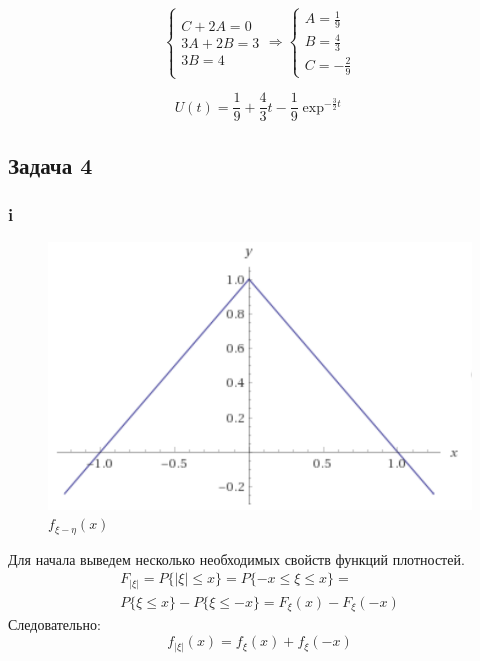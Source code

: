 \documentclass[a4paper,12pt]{article}
\begin{document}
\begin{equation}
\left\{ \begin{array} { l } { C + 2 A = 0 } \\ { 3 A + 2 B = 3 } \\ { 3 B = 4 } \end{array} \Rightarrow \left\{ \begin{array} { l } { A = \frac { 1 } { 9 } } \\ { B = \frac { 4 } { 3 } } \\ { C = - \frac { 2 } { 9 } } \end{array} \right. \right.
\end{equation}


\[ U(t) = \frac{1}{9} + \frac{4}{3}t - \frac{1}{9}\exp^{-\frac{3}{2}t}\]

\subsection{Задача 4}
\subsubsection{i}

 \begin{figure}
	\includegraphics[width=\linewidth]{13}
	\caption{$  f_{\xi - \eta}(x) $}
	\label{minmax}
\end{figure}


Для начала выведем несколько необходимых свойств функций плотностей.
\begin{equation}
\begin{aligned}
	F_{|\xi|} = P\{|\xi| \le x\}  = P\{-x \le \xi \le x \} =\\ P\{\xi \le x \} - P\{\xi \le -x \} = F_\xi(x) - F_\xi(-x) 
\end{aligned}
\end{equation}
Следовательно:
 \[ f_{|\xi|}(x) = f_\xi(x) + f_\xi(-x) \] 
 
\end{document}
